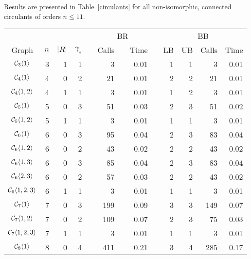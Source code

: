 Results are presented in Table~\ref{circulants} for all non-isomorphic, connected circulants of orders $n \leq 11$. 

\begin{table}[htb!]\centering\footnotesize
 \begin{tabular}{crrr|@{\hspace{0.1cm}}r@{\hspace{0.1cm}}r@{\hspace{0.3cm}}r@{\hspace{0.1cm}}r@{\hspace{0.1cm}}r@{\hspace{0.1cm}}|rrrr}\hline
	&		&		&		&		\multicolumn{5}{c|}{BR}					&	\multicolumn{4}{c}{BB}							\\
Graph	&	$n$	&	$|R|$	&	$\gamma_s$	&	&	Calls	&	&	Time	&	&	LB	&	UB	&	Calls	&	Time	\\\hline
${\cal{C}}_3\langle1\rangle$	&	3	&	1	&	1	&	&	\,3	&	&	0.01	&	&	1	&	1	&	\,3	&	0.01	\\\hline
${\cal{C}}_4\langle1\rangle$	&	4	&	0	&	2	&	&	\,21	&	&	0.01	&	&	2	&	2	&	\,21	&	0.01	\\
${\cal{C}}_4\langle1,2\rangle$	&	4	&	1	&	1	&	&	\,3	&	&	0.01	&	&	1	&	2	&	\,3	&	0.01	\\\hline
${\cal{C}}_5\langle1\rangle$	&	5	&	0	&	3	&	&	\,51	&	&	0.03	&	&	2	&	3	&	\,51	&	0.02	\\
${\cal{C}}_5\langle1,2\rangle$	&	5	&	1	&	1	&	&	\,3	&	&	0.01	&	&	1	&	1	&	\,3	&	0.01	\\\hline
${\cal{C}}_6\langle1\rangle$	&	6	&	0	&	3	&	&	\,95	&	&	0.04	&	&	2	&	3	&	\,83	&	0.04	\\
${\cal{C}}_6\langle1,2\rangle$	&	6	&	0	&	2	&	&	\,43	&	&	0.02	&	&	2	&	2	&	\,43	&	0.02	\\
${\cal{C}}_6\langle1,3\rangle$	&	6	&	0	&	3	&	&	\,85	&	&	0.04	&	&	2	&	3	&	\,83	&	0.04	\\
${\cal{C}}_6\langle2,3\rangle$	&	6	&	0	&	2	&	&	\,57	&	&	0.03	&	&	2	&	2	&	\,43	&	0.02	\\
${\cal{C}}_6\langle1,2,3\rangle$	&	6	&	1	&	1	&	&	\,3	&	&	0.01	&	&	1	&	1	&	\,3	&	0.01	\\\hline
${\cal{C}}_7\langle1\rangle$	&	7	&	0	&	3	&	&	\,199	&	&	0.09	&	&	3	&	3	&	\,149	&	0.07	\\
${\cal{C}}_7\langle1,2\rangle$	&	7	&	0	&	2	&	&	\,109	&	&	0.07	&	&	2	&	3	&	\,75	&	0.03	\\
${\cal{C}}_7\langle1,2,3\rangle$	&	7	&	1	&	1	&	&	\,3	&	&	0.01	&	&	1	&	1	&	\,3	&	0.01	\\\hline
${\cal{C}}_8\langle1\rangle$	&	8	&	0	&	4	&	&	\,411	&	&	0.21	&	&	3	&	4	&	\,285	&	0.17	\\

\end{tabular}
\end{table}
